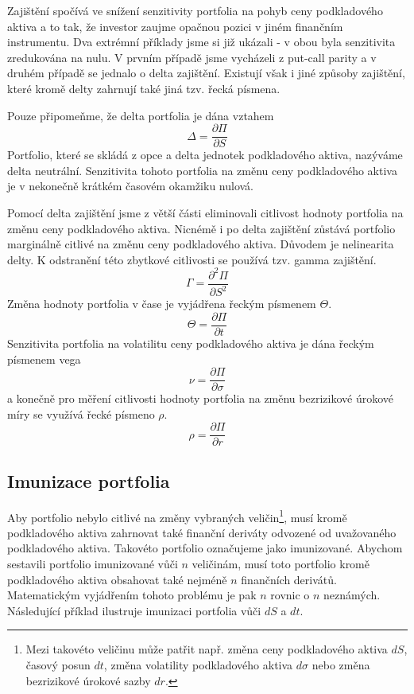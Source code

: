 \documentclass[a4paper]{book}
\begin{document}
Zajištění spočívá ve snížení senzitivity portfolia na pohyb ceny podkladového aktiva a to tak, že investor zaujme opačnou pozici v jiném finančním instrumentu. Dva extrémní příklady jsme si již ukázali - v obou byla senzitivita zredukována na nulu. V prvním případě jsme vycházeli z put-call parity a v druhém případě se jednalo o delta zajištění. Existují však i jiné způsoby zajištění, které kromě delty zahrnují také jiná tzv. řecká písmena.

Pouze připomeňme, že delta portfolia je dána vztahem
\begin{equation*}
\Delta = \frac{\partial \Pi}{\partial S}
\end{equation*}
Portfolio, které se skládá z opce a delta jednotek podkladového aktiva, nazýváme delta neutrální. Senzitivita tohoto portfolia na změnu ceny podkladového aktiva je v nekonečně krátkém časovém okamžiku nulová.

Pomocí delta zajištění jsme z větší části eliminovali citlivost hodnoty portfolia na změnu ceny podkladového aktiva. Nicnémě i po delta zajištění zůstává portfolio marginálně citlivé na změnu ceny podkladového aktiva. Důvodem je nelinearita delty. K odstranění této zbytkové citlivosti se používá tzv. gamma zajištění.
\begin{equation*}
\Gamma = \frac{\partial^2 \Pi}{\partial S^2}
\end{equation*}
Změna hodnoty portfolia v čase je vyjádřena řeckým písmenem $\Theta$.
\begin{equation*}
\Theta = \frac{\partial \Pi}{\partial t}
\end{equation*}
Senzitivita portfolia na volatilitu ceny podkladového aktiva je dána řeckým písmenem vega
\begin{equation*}
\nu = \frac{\partial \Pi}{\partial \sigma}
\end{equation*}
a konečně pro měření citlivosti hodnoty portfolia na změnu bezrizikové úrokové míry se využívá řecké písmeno $\rho$.
\begin{equation*}
\rho = \frac{\partial \Pi}{\partial r}
\end{equation*}
 
\subsection{Imunizace portfolia}

Aby portfolio nebylo citlivé na změny vybraných veličin\footnote{Mezi takovéto veličinu může patřit např. změna ceny podkladového aktiva $dS$, časový posun $dt$, změna volatility podkladového aktiva $d \sigma$ nebo změna bezrizikové úrokové sazby $dr$.}, musí kromě podkladového aktiva zahrnovat také finanční deriváty odvozené od uvažovaného podkladového aktiva. Takovéto portfolio označujeme jako imunizované. Abychom sestavili portfolio imunizované vůči $n$ veličinám, musí toto portfolio kromě podkladového aktiva obsahovat také nejméně $n$ finančních derivátů. Matematickým vyjádřením tohoto problému je pak $n$ rovnic o $n$ neznámých. Následující příklad ilustruje imunizaci portfolia vůči $dS$ a $dt$.
\end{document}
